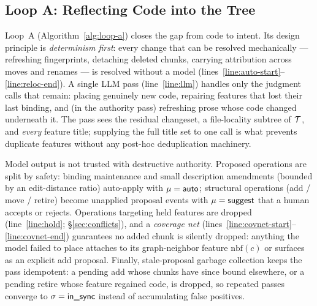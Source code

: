 \subsection{Loop A: Reflecting Code into the Tree}
\label{sec:loop-a}

Loop~A (Algorithm~\ref{alg:loop-a}) closes the gap from code to intent. Its
design principle is \emph{determinism first}: every change that can be resolved
mechanically --- refreshing fingerprints, detaching deleted chunks, carrying
attribution across moves and renames --- is resolved without a model
(lines~\ref{line:auto-start}--\ref{line:reloc-end}). A single LLM pass
(line~\ref{line:llm}) handles only the judgment calls that remain: placing
genuinely new code, repairing features that lost their last binding, and (in
the authority pass) refreshing prose whose code changed underneath it. The
pass sees the residual changeset, a file-locality subtree of $\mathcal{T}$, and
\emph{every} feature title; supplying the full title set to one call is what
prevents duplicate features without any post-hoc deduplication machinery.

Model output is not trusted with destructive authority. Proposed operations
are split by safety: binding maintenance and small description amendments
(bounded by an edit-distance ratio) auto-apply with $\mu = \textsf{auto}$; structural
operations (add / move / retire) become unapplied proposal events with
$\mu = \textsf{suggest}$ that a human accepts or rejects. Operations targeting held
features are dropped (line~\ref{line:hold}; \S\ref{sec:conflicts}), and a
\emph{coverage net}
(lines~\ref{line:covnet-start}--\ref{line:covnet-end}) guarantees no added
chunk is silently dropped: anything the model failed to place attaches to its
graph-neighbor feature $\mathrm{nbf}(c)$ or surfaces as an explicit
\textsf{add} proposal. Finally, stale-proposal garbage collection keeps the
pass idempotent: a pending \textsf{add} whose chunks have since bound
elsewhere, or a pending \textsf{retire} whose feature regained code, is
dropped, so repeated passes converge to $\sigma = \textsf{in\_sync}$ instead of
accumulating false positives.

